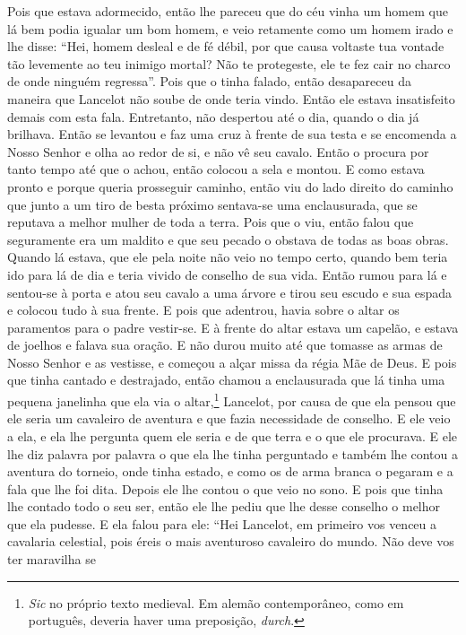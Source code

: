 Pois que estava adormecido, então lhe pareceu que do céu vinha um homem que lá
bem podia igualar um bom homem, e veio retamente como um homem irado e lhe
disse: “Hei, homem desleal e de fé débil, por que causa voltaste tua vontade
tão levemente ao teu inimigo mortal? Não te protegeste, ele te fez cair no
charco de onde ninguém regressa”. Pois que o tinha falado, então desapareceu da
maneira que Lancelot não soube de onde teria vindo. Então ele estava
insatisfeito demais com esta fala. Entretanto, não despertou até o dia, quando
o dia já brilhava. Então se levantou e faz uma cruz à frente de sua testa e se
encomenda a Nosso Senhor e olha ao redor de si, e não vê seu cavalo. Então o
procura por tanto tempo até que o achou, então colocou a sela e montou. E como
estava pronto e porque queria prosseguir caminho, então viu do lado direito do
caminho que junto a um tiro de besta próximo sentava-se uma enclausurada, que
se reputava a melhor mulher de toda a terra. Pois que o viu, então falou que
seguramente era um maldito e que seu pecado o obstava de todas as boas obras.
Quando lá estava, que ele pela noite não veio no tempo certo, quando bem teria
ido para lá de dia e teria vivido de conselho de sua vida. Então rumou para lá
e sentou-se à porta e atou seu cavalo a uma árvore e tirou seu escudo e sua
espada e colocou tudo à sua frente. E pois que adentrou, havia sobre o altar os
paramentos para o padre vestir-se. E à frente do altar estava um capelão, e
estava de joelhos e falava sua oração. E não durou muito até que tomasse as
armas de Nosso Senhor e as vestisse, e começou a alçar missa da régia Mãe de
Deus. E pois que tinha cantado e destrajado, então chamou a enclausurada que lá
tinha uma pequena janelinha que ela via o altar,\footnote{ \textit{Sic} no próprio texto
medieval. Em alemão contemporâneo, como em português, deveria haver uma
preposição, \textit{durch}.}  Lancelot, por
causa de que ela pensou que ele seria um cavaleiro de aventura e que fazia
necessidade de conselho. E ele veio a ela, e ela lhe pergunta quem ele seria e
de que terra e o que ele procurava. E ele lhe diz palavra por palavra o que ela
lhe tinha perguntado e também lhe contou a aventura do torneio, onde tinha
estado, e como os de arma branca o pegaram e a fala que lhe foi dita. Depois
ele lhe contou o que veio no sono. E pois que tinha lhe contado todo o seu ser,
então ele lhe pediu que lhe desse conselho o melhor que ela pudesse. E ela
falou para ele: “Hei Lancelot, em primeiro vos venceu a cavalaria celestial,
pois éreis o mais aventuroso cavaleiro do mundo. Não deve vos ter maravilha se
